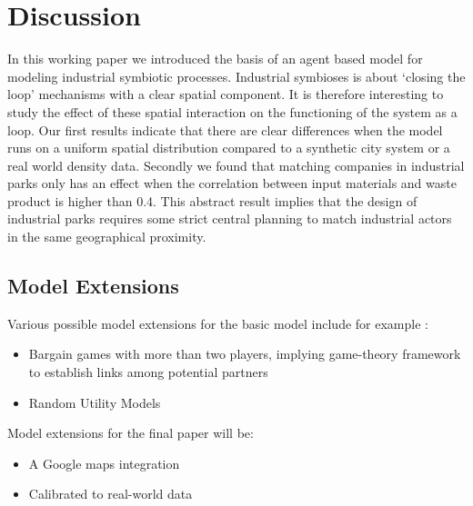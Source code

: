 \documentclass[fleqn,10pt]{wlscirep}
\begin{document}
{%









\section*{Discussion}
In this working paper we introduced the basis of an agent based model for modeling industrial symbiotic processes. Industrial symbioses is about `closing the loop' mechanisms with a clear spatial component. It is therefore interesting to study the effect of these spatial interaction on the functioning of the system as a loop. Our first results indicate that there are clear differences when the model runs on a uniform spatial distribution compared to a synthetic city system or a real world density data. Secondly we found that matching companies in industrial parks only has an effect when the correlation between input materials and waste product is higher than 0.4. This abstract result implies that the design of industrial parks requires some strict central planning to match industrial actors in the same geographical proximity. 



\subsection*{Model Extensions}
Various possible model extensions for the basic model include for example :
\begin{itemize}
\item Bargain games with more than two players, implying game-theory framework to establish links among potential partners
\item Random Utility Models
\end{itemize}

Model extensions for the final paper will be:
\begin{itemize}
\item A Google maps integration  
\item Calibrated to real-world data
\end{itemize}

}
\end{document}
